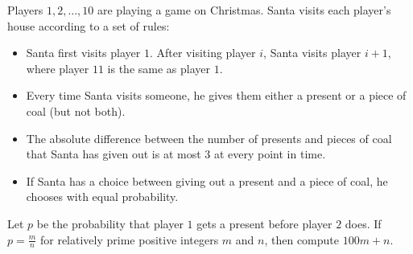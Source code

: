 Players $1,2,\ldots,10$ are playing a game on Christmas. Santa visits each player's house according to a set of rules:

\begin{itemize}
	  \item Santa first visits player $1$. After visiting player $i$, Santa visits player $i+1$, where player $11$ is the same as player $1$.
	  \item Every time Santa visits someone, he gives them either a present or a piece of coal (but not both).
	  \item The absolute difference between the number of presents and pieces of coal that Santa has given out is at most $3$ at every point in time.
	  \item If Santa has a choice between giving out a present and a piece of coal, he chooses with equal probability.
\end{itemize}

Let $p$ be the probability that player $1$ gets a present before player $2$ does. If $p=\frac{m}{n}$ for relatively prime positive integers $m$ and $n$, then compute $100m+n$.
